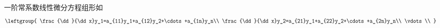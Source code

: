 

一阶常系数线性微分方程组形如
\begin{equation}
\leftgroup{
    \frac{\dd}{\dd x}y_1=a_{11}y_1+a_{12}y_2+\cdots+a_{1n}y_n\\
    \frac{\dd}{\dd x}y_2=a_{21}y_1+a_{22}y_2+\cdots+a_{2n}y_n\\
    \vdots\\
}
\end{equation}






























